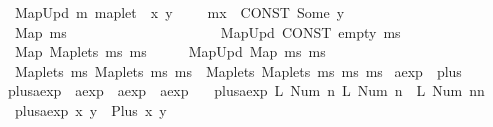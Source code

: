 \begin{isabellebody}
\ \ {\isachardoublequoteopen}{\isacharunderscore}MapUpd\ m\ {\isacharparenleft}{\isacharunderscore}maplet\ \ x\ y{\isacharparenright}{\isachardoublequoteclose}\ \ \ \ {\isasymrightleftharpoons}\ {\isachardoublequoteopen}m{\isacharparenleft}x\ {\isachardollar}{\isacharcolon}{\isacharequal}\ CONST\ Some\ y{\isacharparenright}{\isachardoublequoteclose}\isanewline
\ \ {\isachardoublequoteopen}{\isacharunderscore}Map\ ms{\isachardoublequoteclose}\ \ \ \ \ \ \ \ \ \ \ \ \ \ \ \ \ \ \ \ \ {\isasymrightleftharpoons}\ {\isachardoublequoteopen}{\isacharunderscore}MapUpd\ {\isacharparenleft}CONST\ empty{\isacharparenright}\ ms{\isachardoublequoteclose}\isanewline
\ \ {\isachardoublequoteopen}{\isacharunderscore}Map\ {\isacharparenleft}{\isacharunderscore}Maplets\ ms{}\ ms{}{\isacharparenright}{\isachardoublequoteclose}\ \ \ \ \ {\isasymleftharpoondown}\ {\isachardoublequoteopen}{\isacharunderscore}MapUpd\ {\isacharparenleft}{\isacharunderscore}Map\ ms{}{\isacharparenright}\ ms{}{\isachardoublequoteclose}\isanewline
\ \ {\isachardoublequoteopen}{\isacharunderscore}Maplets\ ms{}\ {\isacharparenleft}{\isacharunderscore}Maplets\ ms{}\ ms{}{\isacharparenright}{\isachardoublequoteclose}\ {\isasymleftharpoondown}\ {\isachardoublequoteopen}{\isacharunderscore}Maplets\ {\isacharparenleft}{\isacharunderscore}Maplets\ ms{}\ ms{}{\isacharparenright}\ ms{}{\isachardoublequoteclose}\isanewline
\isanewline
\isanewline
\isanewline
{}\isamarkupfalse%
\ aexp\ {\isacharcolon}{\isacharcolon}\ plus\ \isanewline
{}\isamarkupfalse%
\ plus{\isacharunderscore}aexp\ {\isacharcolon}{\isacharcolon}\ {\isachardoublequoteopen}aexp\ {\isasymRightarrow}\ aexp\ {\isasymRightarrow}\ aexp{\isachardoublequoteclose}\ \isanewline
\ \ {\isachardoublequoteopen}plus{\isacharunderscore}aexp\ {\isacharparenleft}L\ {\isacharparenleft}Num\ n{}{\isacharparenright}{\isacharparenright}\ {\isacharparenleft}L\ {\isacharparenleft}Num\ n{}{\isacharparenright}{\isacharparenright}\ {\isacharequal}\ L\ {\isacharparenleft}Num\ {\isacharparenleft}n{}{\isacharplus}n{}{\isacharparenright}{\isacharparenright}{\isachardoublequoteclose}\ {\isacharbar}\isanewline
\ \ {\isachardoublequoteopen}plus{\isacharunderscore}aexp\ x\ y\ {\isacharequal}\ Plus\ x\ y{\isachardoublequoteclose}\isanewline
\isanewline
{}\isamarkupfalse%
%
\isadelimproof
\ %
\endisadelimproof
%
\isatagproof

\end{isabellebody}
